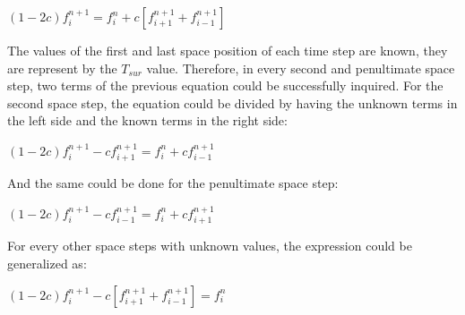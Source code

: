 \documentclass[12pt]{report}
\begin{document}
\begin{center}
\Large
$
(1 - 2c)f_i^{n + 1} = f_i^n + c \left[f_{i + 1}^{n + 1} + f_{i - 1}^{n + 1}\right]
$
\end{center}

\par The values of the first and last space position of each time step are known, they are represent by the $T_{sur}$ value. Therefore, in every second and penultimate space step, two terms of the previous equation could be successfully inquired. For the second space step, the equation could be divided by having the unknown terms in the left side and the known terms in the right side:

\begin{center}
\Large
$
(1 - 2c)f_i^{n + 1} - c f_{i + 1}^{n + 1} = f_i^n + c f_{i - 1}^{n + 1}
$
\end{center}

\par And the same could be done for the penultimate space step:

\begin{center}
\Large
$
(1 - 2c)f_i^{n + 1} - c f_{i - 1}^{n + 1} = f_i^n + c f_{i + 1}^{n + 1}
$
\end{center}

\par For every other space steps with unknown values, the expression could be generalized as:

\begin{center}
\Large
$
(1 - 2c)f_i^{n + 1} - c \left[f_{i + 1}^{n + 1} + f_{i - 1}^{n + 1}\right] = f_i^n 
$
\end{center}
\end{document}
